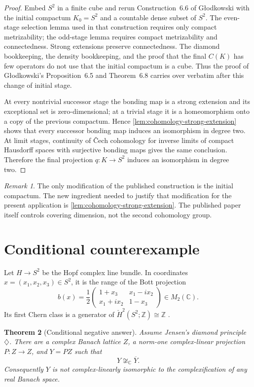 \documentclass[11pt]{article}
\newtheorem{theorem}{Theorem}[section]
\theoremstyle{definition}
\theoremstyle{remark}
\newtheorem{remark}[theorem]{Remark}
\newcommand{\C}{\mathbb C}
\newcommand{\Z}{\mathbb Z}
\newcommand{\Hcheck}{\check H}
\begin{document}
\begin{proof}
Embed $S^2$ in a finite cube and rerun Construction~6.6 of G\l odkowski with the initial compactum $K_0=S^2$ and a countable dense subset of $S^2$. The even-stage selection lemma used in that construction requires only compact metrizability; the odd-stage lemma requires compact metrizability and connectedness. Strong extensions preserve connectedness. The diamond bookkeeping, the density bookkeeping, and the proof that the final $C(K)$ has few operators do not use that the initial compactum is a cube. Thus the proof of G\l odkowski's Proposition~6.5 and Theorem~6.8 carries over verbatim after this change of initial stage.

At every nontrivial successor stage the bonding map is a strong extension and its exceptional set is zero-dimensional; at a trivial stage it is a homeomorphism onto a copy of the previous compactum. Hence \cref{lem:cohomology-strong-extension} shows that every successor bonding map induces an isomorphism in degree two. At limit stages, continuity of \v Cech cohomology for inverse limits of compact Hausdorff spaces with surjective bonding maps \cite{Spanier} gives the same conclusion. Therefore the final projection $q:K\to S^2$ induces an isomorphism in degree two.
\end{proof}

\begin{remark}
The only modification of the published construction is the initial compactum. The new ingredient needed to justify that modification for the present application is \cref{lem:cohomology-strong-extension}. The published paper itself controls covering dimension, not the second cohomology group.
\end{remark}

\section{Conditional counterexample}\label{sec:conditional-counterexample}

Let $H\to S^2$ be the Hopf complex line bundle. In coordinates $x=(x_1,x_2,x_3)\in S^2$, it is the range of the Bott projection
\[
 b(x)=\frac12
 \begin{pmatrix}
 1+x_3 & x_1-ix_2\\
 x_1+ix_2 & 1-x_3
 \end{pmatrix}
 \in M_2(\C).
\]
Its first Chern class is a generator of $\Hcheck^2(S^2;\Z)\cong\Z$ \cite{Spanier}.

\begin{theorem}[Conditional negative answer]\label{thm:diamond-counterexample}
Assume Jensen's diamond principle $\diamondsuit$. There are a complex Banach lattice $Z$, a norm-one complex-linear projection $P:Z\to Z$, and $Y=PZ$ such that
\[
       Y\not\cong_{\C}\overline Y.
\]
Consequently $Y$ is not complex-linearly isomorphic to the complexification of any real Banach space.
\end{theorem}
\end{document}
